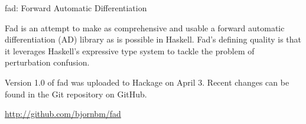 \documentclass{article}
\begin{document}
\begin{hcarentry}{fad: Forward Automatic Differentiation}
\makeheader

Fad is an attempt to make as comprehensive and usable a forward automatic differentiation (AD) library as is possible in Haskell.
Fad's defining quality is that it leverages Haskell's expressive type system to tackle the problem of perturbation confusion.

Version 1.0 of fad was uploaded to Hackage on April 3. Recent changes can be found in the Git repository on GitHub.



\FurtherReading
  \url{http://github.com/bjornbm/fad}
\end{hcarentry}
\end{document}
